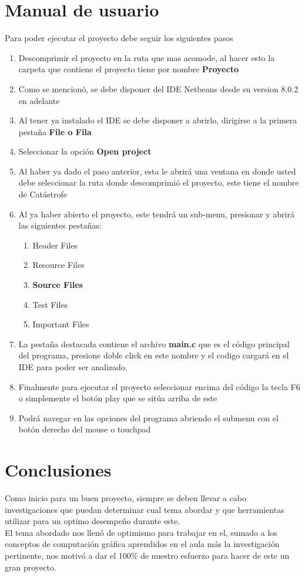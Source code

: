 \documentclass[12pt,journal,compsoc]{IEEEtran}
\begin{document}
\section{Manual de usuario}
Para poder ejecutar el proyecto debe seguir los siguientes pasos
\begin{enumerate}
	\item Descomprimir el proyecto en la ruta que mas acomode, al  hacer esto la carpeta que contiene el proyecto tiene por nombre \textbf{Proyecto}
	\item Como se mencionó, se debe disponer del IDE Netbeans desde su version 8.0.2 en adelante
	\item Al tener ya instalado el IDE se debe disponer a abrirlo, dirigirse a la primera pestaña \textbf{File o Fila}
	\item Seleccionar la opción \textbf{Open project}
	\item Al haber ya dado el paso anterior, esta le abrirá una ventana en donde usted debe seleccionar la ruta donde descomprimió el proyecto, este tiene el nombre de Catástrofe
	\item Al ya haber abierto el proyecto, este tendrá un sub-menu, presionar y abrirá las siguientes pestañas:
		\begin{enumerate}
			\item Header Files
			\item Resource Files
			\item \textbf{Source Files}
			\item Test Files
			\item Important Files
		\end{enumerate}
	\item La pestaña destacada contiene el archivo \textbf{main.c} que es el código principal del programa, presione doble click en este nombre y el codigo cargará en el IDE para poder ser analizado.
	\item Finalmente para ejecutar el proyecto seleccionar encima del código la tecla F6 o simplemente el botón play que se sitúa arriba de este
	\item Podrá navegar en las opciones del programa abriendo el submenu con el botón derecho del mouse o touchpad
\end{enumerate}
\section{Conclusiones}
%
Como inicio para un buen proyecto, siempre se deben llevar a cabo investigaciones que puedan determinar cual tema abordar y que herramientas utilizar para un optimo desempeño durante este.\\
El tema abordado nos llenó de optimismo para trabajar en el, sumado a los conceptos de computación gráfica aprendidos en el aula más la investigación pertinente, nos motivó a dar el 100\% de nuestro esfuerzo para hacer de este un gran proyecto.
%


\end{document}

